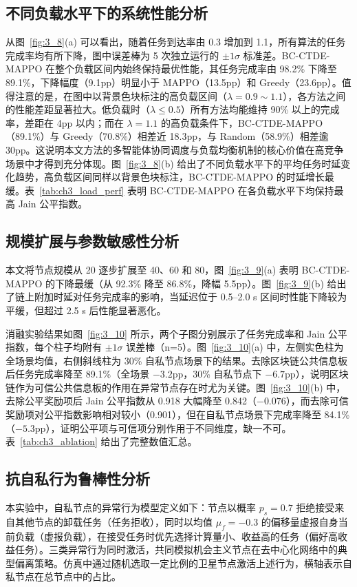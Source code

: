 \subsection{不同负载水平下的系统性能分析}
从图~\ref{fig:3_8}(a) 可以看出，随着任务到达率由 0.3 增加到 1.1，所有算法的任务完成率均有所下降，图中误差棒为 5 次独立运行的 $\pm1\sigma$ 标准差。BC-CTDE-MAPPO 在整个负载区间内始终保持最优性能，其任务完成率由 98.2\% 下降至 89.1\%，下降幅度（9.1pp）明显小于 MAPPO（13.5pp）和 Greedy（23.6pp）。值得注意的是，在图中以背景色块标注的高负载区间（$\lambda=0.9\sim1.1$），各方法之间的性能差距显著拉大。低负载时（$\lambda\leq0.5$）所有方法均能维持 90\% 以上的完成率，差距在 4pp 以内；而在 $\lambda=1.1$ 的高负载条件下，BC-CTDE-MAPPO（89.1\%）与 Greedy（70.8\%）相差近 18.3pp，与 Random（58.9\%）相差逾 30pp。这说明本文方法的多智能体协同调度与负载均衡机制的核心价值在高竞争场景中才得到充分体现。图~\ref{fig:3_8}(b) 给出了不同负载水平下的平均任务时延变化趋势，高负载区间同样以背景色块标注，BC-CTDE-MAPPO 的时延增长最缓。表~\ref{tab:ch3_load_perf} 表明 BC-CTDE-MAPPO 在各负载水平下均保持最高 Jain 公平指数。

\subsection{规模扩展与参数敏感性分析}
本文将节点规模从 20 逐步扩展至 40、60 和 80，图~\ref{fig:3_9}(a) 表明 BC-CTDE-MAPPO 的下降最缓（从 92.3\% 降至 86.8\%，降幅 5.5pp）。图~\ref{fig:3_9}(b) 给出了链上附加时延对任务完成率的影响，当延迟位于 0.5--2.0 s 区间时性能下降较为平缓，但超过 2.5 s 后性能显著恶化。

消融实验结果如图~\ref{fig:3_10} 所示，两个子图分别展示了任务完成率和 Jain 公平指数，每个柱子均附有 $\pm1\sigma$ 误差棒（n=5）。图~\ref{fig:3_10}(a) 中，左侧实色柱为全场景均值，右侧斜线柱为 30\% 自私节点场景下的结果。去除区块链公共信息板后任务完成率降至 89.1\%（全场景 $-3.2$pp，30\% 自私节点下 $-6.7$pp），说明区块链作为可信公共信息板的作用在异常节点存在时尤为关键。图~\ref{fig:3_10}(b) 中，去除公平奖励项后 Jain 公平指数从 0.918 大幅降至 0.842（$-0.076$），而去除可信奖励项对公平指数影响相对较小（0.901），但在自私节点场景下完成率降至 84.1\%（$-5.3$pp），证明公平项与可信项分别作用于不同维度，缺一不可。表~\ref{tab:ch3_ablation} 给出了完整数值汇总。

\subsection{抗自私行为鲁棒性分析}
本实验中，自私节点的异常行为模型定义如下：节点以概率 $p_s=0.7$ 拒绝接受来自其他节点的卸载任务（任务拒收），同时以均值 $\mu_f = -0.3$ 的偏移量虚报自身当前负载（虚报负载），在接受任务时优先选择计算量小、收益高的任务（偏好高收益任务）。三类异常行为同时激活，共同模拟机会主义节点在去中心化网络中的典型偏离策略。仿真中通过随机选取一定比例的卫星节点激活上述行为，横轴表示自私节点在总节点中的占比。

